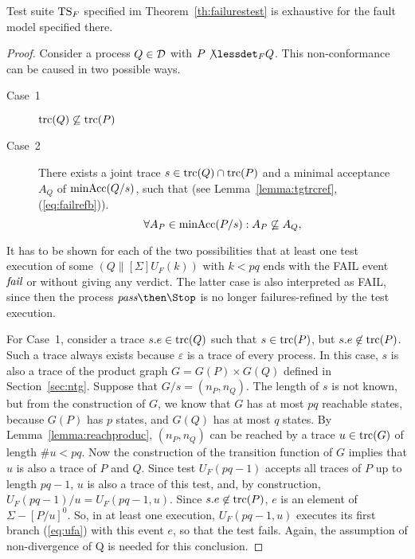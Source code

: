 \begin{lemma}\label{lemma:mainfexhaustive}
Test suite ${\text{TS}}_F$ specified im Theorem~\ref{th:failurestest} is exhaustive for the fault
model specified there.
\end{lemma}
\begin{proof}
Consider a process $Q\in{\cal D}$ with
$P\not\lessdet_F Q$. This non-conformance can be caused in two possible ways.
\begin{description}
\item[Case~1] $\text{trc}(Q)\not\subseteq \text{trc}(P)$
\item[Case~2] There exists a joint trace $s\in\text{trc}(Q)\cap\text{trc}(P)$ and a minimal acceptance $A_Q$
of $\text{minAcc}(Q/s)$, such that
(see Lemma~\ref{lemma:tgtrcref}, (\ref{eq:failrefb})).
\begin{equation}
\label{eq:accsnotcontained}
\forall A_P\in\text{minAcc}(P/s): A_P\not\subseteq A_Q,
\end{equation}
\end{description}
It has to be shown for each of the two possibilities that at least one test
execution of some $(Q\parallel[\Sigma] U_F(k))$ with $k < pq$ ends with the
FAIL event ${\text{\it fail}}$ or without giving any verdict. The latter case is also
interpreted  as FAIL, since then the process $\epass\then\Stop$ is no longer
failures-refined by the test execution.

For Case~1, consider a  trace $s.e\in\text{trc}(Q)$ such that $s\in\text{trc}(P)$, but
$s.e\not\in\text{trc}(P)$. Such a trace always exists because $\varepsilon$ is a
trace of every process. In this case, $s$ is also a trace of the product
graph $G = G(P)\times G(Q)$ defined in Section~\ref{sec:ntg}. Suppose that
$G/s = (n_P,n_Q)$. The length of $s$ is not known, but from the construction
of $G$,  we know that $G$ has at most $pq$ reachable states, because $G(P)$
has $p$ states, and $G(Q)$ has at most $q$ states. By
Lemma~\ref{lemma:reachproduc}, $(n_P,n_Q)$ can be reached by a trace
$u\in\text{trc}(G)$ of length $\#u < pq$. Now the construction of the transition
function of $G$ implies that $u$ is also a trace of $P$ and $Q$. Since test
$U_F(pq-1)$ accepts all traces of $P$ up to length $pq-1$, $u$ is also a
trace of this test, and, by construction, $U_F(pq-1)/u = U_F(pq-1,u)$. Since
$s.e\not\in\text{trc}(P)$, $e$ is an element of $\Sigma-[P/u]^0$. So, in at least
one execution, $U_F(pq-1,u)$ executes its first branch (\ref{eq:ufa}) with
this event $e$, so that the test fails. Again, the
assumption of non-divergence of Q is needed for this conclusion. %


\end{proof}
